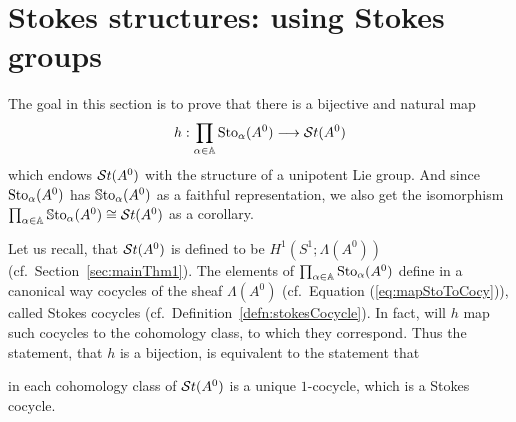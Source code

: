 \section{Stokes structures: using Stokes groups}\label{sec:mainThm2}

The goal in this section is to prove that there is a bijective and natural map
\[
  h:\prod_{\alpha\in\mathbb{A}}\operatorname{Sto}_\alpha(A^0)\longrightarrow\mathcal{S}{}t(A^0)
\]
which endows $\mathcal{S}{}t(A^0)$ with the structure of a unipotent Lie group.
And since $\operatorname{Sto}_\alpha(A^0)$ has $\operatorname{\mathbb{S}to}_\alpha(A^0)$ as a faithful
representation, we also get the isomorphism
$\prod_{\alpha\in\mathbb{A}}\operatorname{\mathbb{S}to}_\alpha(A^0)\cong\mathcal{S}{}t(A^0)$ as a corollary.

Let us recall, that $\mathcal{S}{}t(A^0)$ is defined to be $H^1(S^1;\Lambda(A^0))$
(cf.\ Section~\ref{sec:mainThm1}).
The elements of $\prod_{\alpha\in\mathbb{A}}\operatorname{Sto}_\alpha(A^0)$ define in a canonical way
cocycles of the sheaf $\Lambda(A^0)$ (cf.\ Equation (\ref{eq:mapStoToCocy})),
called Stokes cocycles (cf.\ Definition~\ref{defn:stokesCocycle}).
In fact, will $h$ map such cocycles to the cohomology class, to which they
correspond.
Thus the statement, that $h$ is a bijection, is equivalent to the statement
that
\begin{einr}
  in each cohomology class of $\mathcal{S}{}t(A^0)$ is a unique $1$-cocycle, which is a
  Stokes cocycle.
\end{einr}

